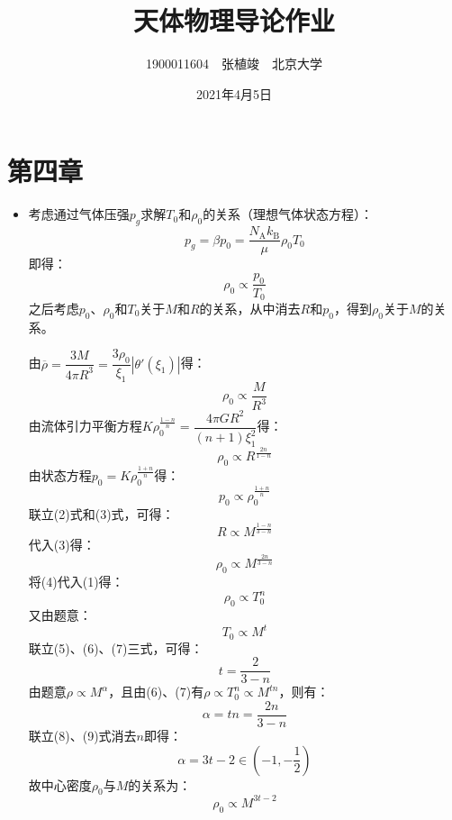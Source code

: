 \documentclass[a4paper,fontset=none]{ctexart}
\begin{document}
    \title{\textbf{天体物理导论作业}}
    \author{1900011604\ \ 张植竣\ \ 北京大学}
    \date{2021年4月5日}
    \maketitle

    \section*{第四章}

    \begin{itemize}

        \item[2.]
        考虑通过气体压强$p_g$求解$T_0$和$\rho_0$的关系（理想气体状态方程）：
        \[
        p_g = \beta p_0 = \frac{N_\mathrm{A}k_\mathrm{B}}{\mu}\rho_0T_0
        \]
        即得：
        \begin{equation}
            \rho_0 \propto \frac{p_0}{T_0}
        \end{equation}
        之后考虑$p_0$、$\rho_0$和$T_0$关于$M$和$R$的关系，从中消去$R$和$p_0$，得到$\rho_0$关于$M$的关系。

        由$\overline{\rho}=\dfrac{3M}{4\pi R^3}=\dfrac{3\rho_0}{\xi_1}|\theta'(\xi_1)|$得：
        \begin{equation}
            \rho_0 \propto \frac{M}{R^3}
        \end{equation}
        由流体引力平衡方程$K\rho_0^{\tfrac{1-n}{n}}=\dfrac{4\pi GR^2}{(n+1)\xi_1^2}$得：
        \begin{equation}
            \rho_0 \propto R^{\tfrac{2n}{1-n}}
        \end{equation}
        由状态方程$p_0=K\rho_0^{\tfrac{1+n}{n}}$得：
        \begin{equation}
            p_0 \propto \rho_0^{\tfrac{1+n}{n}}
        \end{equation}
        联立(2)式和(3)式，可得：
        \[
        R \propto M^{\tfrac{1-n}{3-n}}
        \]
        代入(3)得：
        \begin{equation}
            \rho_0 \propto M^{\tfrac{2n}{3-n}}
        \end{equation}
        将(4)代入(1)得：
        \begin{equation}
            \rho_0 \propto T_0^{n}
        \end{equation}
        又由题意：
        \begin{equation}
            T_0 \propto M^t
        \end{equation}
        联立(5)、(6)、(7)三式，可得：
        \begin{equation}
            t = \frac{2}{3-n}
        \end{equation}
        由题意$\rho\propto M^\alpha$，且由(6)、(7)有$\rho\propto T_0^n\propto M^{tn}$，则有：
        \begin{equation}
            \alpha = tn = \frac{2n}{3-n}
        \end{equation}
        联立(8)、(9)式消去$n$即得：
        \[
        \alpha = 3t-2 \in (-1,-\frac{1}{2})
        \]
        故中心密度$\rho_0$与$M$的关系为：
        \[
        \rho_0 \propto M^{3t-2}
        \]


\end{itemize}
\end{document}
